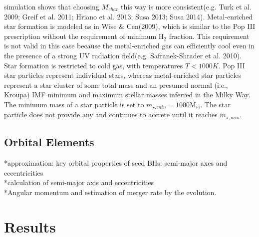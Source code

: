 \documentclass[useAMS,usenatbib]{mn2e}
\begin{document}
simulation shows that choosing $M_{char}$ this way is more consistent(e.g. Turk
et al. 2009; Greif et al. 2011; Hriano et al. 2013; Susa 2013; Susa 2014).
Metal-enriched star formation is modeled as in Wise \& Cen(2009), which is
similar to the Pop III prescription without the requirement of minimum
$\mbox{H}_2$ fraction. This requirement is not valid in this case because the
metal-enriched gas can efficiently cool even in the presence of a strong UV
radiation field(e.g. Safranek-Shrader et al. 2010). Star formation is restricted
to cold gas, with temperatures $T < 1000 K$. Pop III star particles represent
individual stars, whereas metal-enriched star particles represent a star cluster
of some total mass and an presumed normal (i.e., Kroupa) IMF minimum and maximum
stellar masses inferred in the Milky Way. The minimum mass of a star particle is
set to $m_{\star,min} = 1000 \mbox{M}_{\odot}$. The star particle does not
provide any and continues to accrete until it reaches $m_{\star,min}$.


\subsection{Orbital Elements}
*approximation: key orbital properties of seed BHs: semi-major axes and
eccentricities\\
*calculation of semi-major axis and eccentricities\\
*Angular momentum and estimation of merger rate by the evolution.\\

\section{Results}
\end{document}
